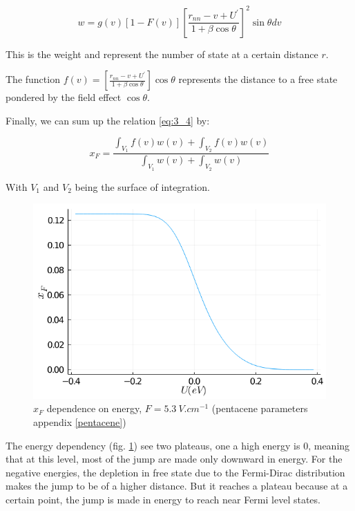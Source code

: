 \begin{equation}
    w = g(v)\left[1-F(v)\right]\left[\frac{r_{nn}-v+U^{\prime}}{1+\beta \cos \theta}\right]^{2} \sin \theta d v
\end{equation}

This is the weight and represent the number of state at a certain distance $r$.

The function $f(v) = \left[\frac{r_{nn}-v+U^{\prime}}{1+\beta \cos \theta}\right] \cos \theta$ represents the distance to a free state pondered by the field effect $\cos \theta$.

Finally, we can sum up the relation \ref{eq:3_4} by:

\begin{equation}
    x_F = \frac{\int_{V_1} f(v)w(v) + \int_{V_2} f(v)w(v)}{\int_{V_1} w(v) + \int_{V_2} w(v)}
\end{equation}

With $V_1$ and $V_2$ being the surface of integration.

\begin{figure}[!h]
    \centering
    \includegraphics*[width=.5\paperwidth]{figures/3_elec/xf.png}
    \caption{$x_F$ dependence on energy, $F = \SI{5.3}{V . cm^{-1}}$ (pentacene parameters appendix \ref{pentacene})\label{fig:3_4}}
\end{figure}

The energy dependency (fig. \ref{fig:3_4}) see two plateaus, one a high energy is $0$, meaning that at this level, most of the jump are made only downward in energy. For the negative energies, the depletion in free state due to the Fermi-Dirac distribution makes the jump to be of a higher distance. But it reaches a plateau because at a certain point, the jump is made in energy to reach near Fermi level states.

